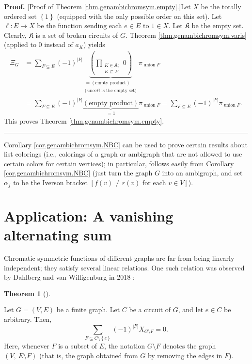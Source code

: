 \documentclass[numbers=enddot,12pt,final,onecolumn,notitlepage]{scrartcl}%
\theoremstyle{definition}
\newtheorem{theo}{Theorem}[section]
\newenvironment{theorem}[1][]
{\begin{theo}[#1]\begin{leftbar}}
{\end{leftbar}\end{theo}}
\newenvironment{proof}[1][Proof]{\noindent\textbf{#1.} }{\ \rule{0.5em}{0.5em}}
\newenvironment{verlong}{}{}
\let\sumnonlimits\sum
\let\prodnonlimits\prod
\renewcommand{\sum}{\sumnonlimits\limits}
\renewcommand{\prod}{\prodnonlimits\limits}
\begin{document}
\begin{verlong}
\begin{proof}
[Proof of Theorem \ref{thm.genambichromsym.empty}.]Let $X$ be the totally
ordered set $\left\{  1\right\}  $ (equipped with the only possible order on
this set). Let $\ell:E\rightarrow X$ be the function sending each $e\in E$ to
$1\in X$. Let $\mathfrak{K}$ be the empty set. Clearly, $\mathfrak{K}$ is a
set of broken circuits of $G$. Theorem \ref{thm.genambichromsym.varis}
(applied to $0$ instead of $a_{K}$) yields%
\begin{align*}
\Xi_{G}  &  =\sum_{F\subseteq E}\left(  -1\right)  ^{\left\vert F\right\vert
}\underbrace{\left(  \prod_{\substack{K\in\mathfrak{K};\\K\subseteq
F}}0\right)  }_{\substack{=\left(  \text{empty product}\right)  \\\text{(since
}\mathfrak{K}\text{ is the empty set)}}}\pi_{\operatorname*{union}F}\\
&  =\sum_{F\subseteq E}\left(  -1\right)  ^{\left\vert F\right\vert
}\underbrace{\left(  \text{empty product}\right)  }_{=1}\pi
_{\operatorname*{union}F}=\sum_{F\subseteq E}\left(  -1\right)  ^{\left\vert
F\right\vert }\pi_{\operatorname*{union}F}.
\end{align*}
This proves Theorem \ref{thm.genambichromsym.empty}.
\end{proof}
\end{verlong}

Corollary \ref{cor.genambichromsym.NBC} can be used to prove certain results
about list colorings (i.e., colorings of a graph or ambigraph that are not
allowed to use certain colors for certain vertices); in particular,
\cite[Lemma 3.2]{Erey19} follows easily from Corollary
\ref{cor.genambichromsym.NBC} (just turn the graph $G$ into an ambigraph, and
set $\alpha_{f}$ to be the Iverson bracket $\left[  f\left(  v\right)  \neq
r\left(  v\right)  \text{ for each }v\in V\right]  $).


\section{\label{sec.alt-sum}Application: A vanishing alternating sum}

Chromatic symmetric functions of different graphs are far from being linearly
independent; they satisfy several linear relations. One such relation was
observed by Dahlberg and van Willigenburg in 2018 \cite[Proposition
5]{DahWil18}:

\begin{theorem}
\label{thm.dahwil.graph}Let $G=\left(  V,E\right)  $ be a finite graph. Let
$C$ be a circuit of $G$, and let $e\in C$ be arbitrary. Then,%
\[
\sum_{F\subseteq C\setminus\left\{  e\right\}  }\left(  -1\right)
^{\left\vert F\right\vert }X_{G\setminus F}=0.
\]
Here, whenever $F$ is a subset of $E$, the notation $G\setminus F$ denotes the
graph $\left(  V,\ E\setminus F\right)  $ (that is, the graph obtained from
$G$ by removing the edges in $F$).
\end{theorem}
\end{document}
